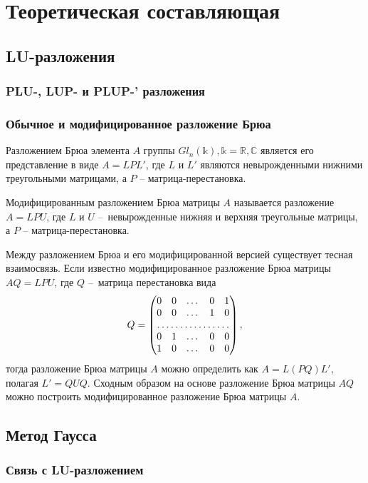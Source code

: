 \section{Теоретическая составляющая}

\subsection{LU-разложения}
\subsubsection{PLU-, LUP- и PLUP-' разложения}
\subsubsection{Обычное и модифицированное разложение Брюа}


Разложением Брюа элемента $A$ группы $Gl_n(\mathbb{k}), \mathbb{k} = \mathbb{R}, \mathbb{C}$ является его представление в виде $A=LPL'$, где $L$ и $L'$ являются невырожденными нижними треугольными матрицами, а $P$ – матрица-перестановка. 

Модифицированным разложением Брюа матрицы $A$ называется разложение $A=LPU$, где $L$ и $U$ – невырожденные нижняя и верхняя треугольные матрицы, а $P$ – матрица-перестановка.

Между разложением Брюа и его модифицированной версией существует тесная взаимосвязь. Если известно модифицированное разложение Брюа матрицы $AQ=LPU$, где $Q$ – матрица перестановка вида
\[
Q = 
	\begin{pmatrix}
	0 & 0 & \dots & 0 & 1  \\
	0 & 0 & \dots & 1 & 0  \\
	\hdotsfor{5}           \\
	0 & 1 & \dots & 0 & 0  \\
	1 & 0 & \dots & 0 & 0  
	\end{pmatrix},
\]
тогда разложение Брюа матрицы $A$ можно определить как $A=L(PQ)L'$, полагая $L'=QUQ$. Сходным образом на основе разложение Брюа матрицы $AQ$ можно построить модифицированное разложение Брюа матрицы $A$.


\subsection{Метод Гаусса}
\subsubsection{Связь с LU-разложением}

